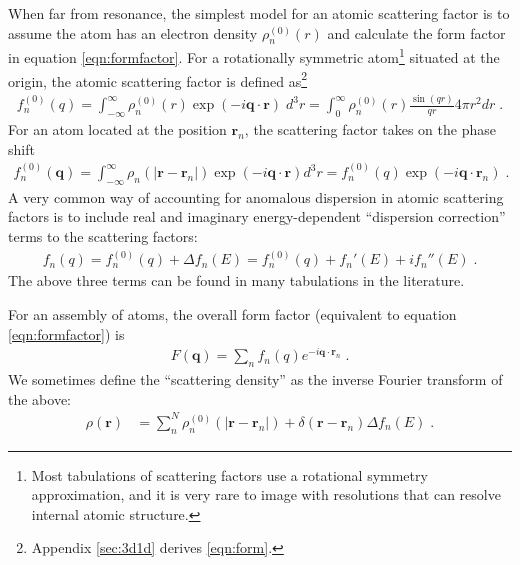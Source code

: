 \documentclass[12pt]{article}
\renewcommand{\vec}[1]{\boldsymbol{#1}}
\newcommand{\abs}[1]{\left| #1 \right|}
\begin{document}
When far from resonance, the simplest model for an atomic scattering 
factor is to assume the atom has an
electron density $\rho_n^{(0)}(r)$ and calculate the form factor in equation 
\ref{eqn:formfactor}.  For a rotationally symmetric atom\footnote{Most 
tabulations of scattering factors use a rotational symmetry approximation, and 
it is very rare to image with resolutions that can resolve internal atomic 
structure.} situated at the origin, the atomic scattering factor is defined
as\footnote{Appendix \ref{sec:3d1d} derives \ref{eqn:form}.}
\begin{align}
f_n^{(0)}(q)  = \int_{-\infty}^\infty \rho_n^{(0)}(r) \exp(-i 
\vec{q}\cdot\vec{r}) \; d^3r = \int_0^\infty \rho_n^{(0)}(r)   
\frac{\sin(qr)}{qr}  4\pi r^2 dr \; . \label{eqn:form}
\end{align}
For an atom located at the position $\vec{r}_n$, the scattering factor takes on 
the phase shift
\begin{align}
f_n^{(0)}(\vec{q})  = \int_{-\infty}^\infty \rho_n(|\vec{r}-\vec{r}_n|) \exp(-i 
\vec{q}\cdot\vec{r}) d^3r = f_n^{(0)}(q)
\exp(-i \vec{q}\cdot\vec{r}_n)  \; .
\end{align}
A very common way of accounting for anomalous dispersion in atomic scattering 
factors is to include real and imaginary energy-dependent ``dispersion 
correction'' terms to the scattering factors:
\begin{align}
f_n(q) = f_n^{(0)}(q) + \Delta f_n(E) = f_n^{(0)}(q) + f_n'(E) + i f_n''(E)  \;.
\end{align}
The above three terms can be found in many tabulations in the literature.

For an assembly of atoms, the overall form factor (equivalent to equation 
\ref{eqn:formfactor}) is
\begin{align}
F(\vec{q})  = \sum_n f_n(q)
e^{-i \vec{q}\cdot\vec{r}_n}  \; .
\end{align}
We sometimes define the ``scattering density'' as the inverse 
Fourier transform of the above:
\begin{align}\label{eqn:scatterdens}
\rho(\vec{r})  &= \sum_n^N \rho_n^{(0)}(|\vec{r}-\vec{r}_n|) +  
\delta(\vec{r}-\vec{r}_n) \Delta f_n(E) \; .
\end{align}


% 
% 
% 
\end{document}
